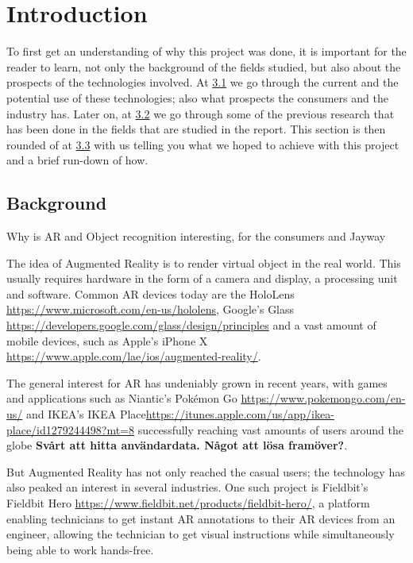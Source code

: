 \section{Introduction}
To first get an understanding of why this project was done, it is important for the reader to learn, not only the background of the fields studied, but also about the prospects of the technologies involved.
 At \hyperref[subsec:Background]{3.1} we go through the current and the potential use of these technologies; also what prospects the consumers and the industry has. Later on, at  \hyperref[subsec:PrevStud]{3.2} we go through some of the previous research that has been done in the fields that are studied in the report. This section is then rounded of at \hyperref[subsec:Goal]{3.3} with us telling you what we hoped to achieve with this project and a brief run-down of how.

\subsection{Background}
\label{subsec:Background}
Why is AR and Object recognition interesting, for the consumers and Jayway

The idea of Augmented Reality is to render virtual object in the real world. This usually requires hardware in the form of a camera and display, a processing unit and software. Common AR devices today are the HoloLens \url{https://www.microsoft.com/en-us/hololens}, Google's Glass \url{https://developers.google.com/glass/design/principles} and a vast amount of mobile devices, such as Apple's iPhone X \url{https://www.apple.com/lae/ios/augmented-reality/}. 

The general interest for AR has undeniably grown in recent years, with games and applications such as Niantic's Pokémon Go \url{https://www.pokemongo.com/en-us/} and IKEA's IKEA Place\url{https://itunes.apple.com/us/app/ikea-place/id1279244498?mt=8} successfully reaching vast amounts of users around the globe \textbf{Svårt att hitta användardata. Något att lösa framöver?}.

 But Augmented Reality has not only reached the casual users; the technology has also peaked an interest in several industries. One such project is Fieldbit's Fieldbit Hero \url{https://www.fieldbit.net/products/fieldbit-hero/}, a platform enabling technicians to get instant AR annotations to their AR devices from an engineer, allowing the technician to get visual instructions while simultaneously  being able to work hands-free. 



